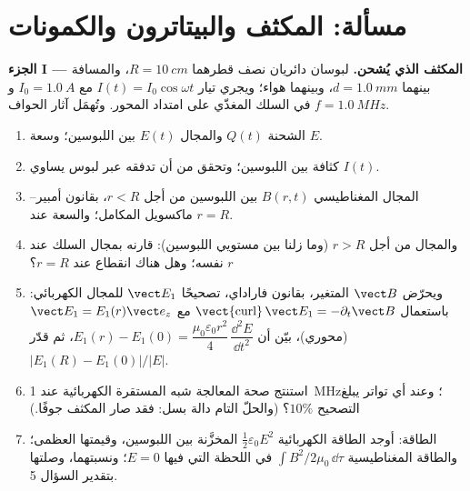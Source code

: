 \section{مسألة: المكثف والبيتاترون والكمونات}

\begin{problem}
\label{pb:b2:maxwell-equations:1}

\medskip
\noindent\textbf{الجزء I --- المكثف الذي يُشحن.}
لبوسان دائريان نصف قطرهما $R = \qty{10}{cm}$، والمسافة بينهما $d = \qty{1.0}{mm}$،
وبينهما هواء؛ ويجري تيار $I(t) = I_0\cos\omega t$ مع $I_0 = \qty{1.0}{A}$ و $f = \qty{1.0}{MHz}$
في السلك المغذّي على امتداد المحور. وتُهمَل آثار الحواف.
\begin{enumerate}
  \item الشحنة $Q(t)$ والمجال $E(t)$ بين اللبوسين؛ وسعة
        $E$.
  \item كثافة  بين اللبوسين؛ وتحقق من أن
        تدفقه عبر لبوس يساوي $I(t)$.
  \item المجال المغناطيسي $B(r, t)$ بين اللبوسين من أجل $r < R$، بقانون
        أمبير--ماكسويل المكامل؛ والسعة عند $r = R$.
  \item والمجال من أجل $r > R$ (وما زلنا بين مستويي اللبوسين):
        قارنه بمجال السلك عند $r$ نفسه؛ وهل هناك
        انقطاع عند $r = R$؟
  \item ويحرّض $\vect B$ المتغير، بقانون فاراداي، تصحيحًا
        $\vect E_1$ للمجال الكهربائي: باستعمال $\operatorname{\vect{curl}}\vect E_1
        = -\partial_t\vect B$ مع $\vect E_1 = E_1(r)\vect e_z$ (محوري)، بيّن أن
        $E_1(r) - E_1(0) = \dfrac{\mu_0\varepsilon_0r^2}4\,\dfrac{\dd^2E}{\dd t^2}$، ثم
        قدّر $|E_1(R) - E_1(0)|/|E|$.
  \item استنتج صحة المعالجة شبه المستقرة الكهربائية
        عند \qty{1}{MHz}؛ وعند أي تواتر يبلغ التصحيح
        $10\%$؟ (والحلّ التام دالة بسل: فقد صار
        المكثف جوفًا.)
  \item الطاقة: أوجد الطاقة الكهربائية $\tfrac12\varepsilon_0E^2$ المخزَّنة بين
        اللبوسين، وقيمتها العظمى؛ والطاقة المغناطيسية $\int B^2/2\mu_0\,\dd\tau$
        في اللحظة التي فيها $E = 0$؛ ونسبتهما، وصلتها
        بتقدير السؤال 5.
\end{enumerate}


\end{problem}
